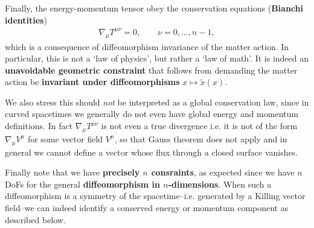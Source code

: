 \documentclass[../geometry_main.tex]{subfiles}
\begin{document}
\begin{mytheorem}
Finally, the energy-momentum tensor obey the conservation equations (\textbf{Bianchi identities})
\begin{align}
    \nabla_\mu T^{\mu\nu} = 0,\qquad \nu=0,\ldots, n-1,
\end{align}
which is a consequence of diffeomorphism invariance of the matter action.
In particular, this is not a `law of physics', but rather a `law of math'.
It is indeed an \textbf{unavoidable geometric constraint} that follows from demanding the matter action be \textbf{invariant under diffeomorphisms} $x\mapsto \tilde{x}(x)$.

We also stress this should \emph{not} be interpreted as a global conservation law, since in curved spacetimes we generally do not even have global energy and momentum definitions.
In fact $\nabla_\mu T^{\mu\nu}$ is not even a true divergence i.e. it is not of the form $\nabla_\mu V^\mu$ for some vector field $V^\mu$, so that Gauss theorem does not apply and in general we cannot define a vector whose flux through a closed surface vanishes.

Finally note that we have \textbf{precisely $n$ consraints}, as expected since we have $n$ DoFs for the general \textbf{diffeomorphism in $n$-dimensions}.
When such a diffeomorphism is a symmetry of the spacetime--i.e. generated by a Killing vector field--we can indeed identify a conserved energy or momentum component as described below.
%
\end{mytheorem}
\end{document}
